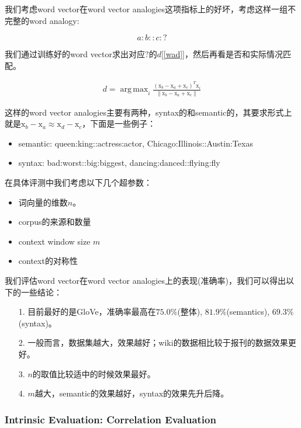 \documentclass{article}
\DeclareMathOperator*{\argmax}{arg\,max}
\begin{document}
我们考虑word vector在word vector analogies这项指标上的好坏，考虑这样一组不完整的word analogy:

$$a:b::c:\text{?}$$

我们通过训练好的word vector求出对应$?$的$d$[\ref{wad}]，然后再看是否和实际情况匹配。

\begin{eqnarray}
\label{wad}
d=\argmax_{i}{\frac{(\mathrm{x}_b-\mathrm{x}_a+\mathrm{x}_c)^T\mathrm{x}_i}{\|\mathrm{x}_b-\mathrm{x}_a+\mathrm{x}_c \|}}
\end{eqnarray}

这样的word vector analogies主要有两种，syntax的和semantic的，其要求形式上就是$\mathrm{x}_b-\mathrm{x}_a \approx \mathrm{x}_d-\mathrm{x}_c$，下面是一些例子：

\begin{itemize}
	\item semantic: queen:king::actress:actor, Chicago:Illinois::Austin:Texas
	\item syntax: bad:worst::big:biggest, dancing:danced::flying:fly
\end{itemize}

在具体评测中我们考虑以下几个超参数：

\begin{itemize}
	\item 词向量的维数$n$。
	\item corpus的来源和数量
	\item context window size $m$
	\item context的对称性
\end{itemize}

我们评估word vector在word vector analogies上的表现(准确率)，我们可以得出以下的一些结论：

\begin{itemize}
	\item[1.] 目前最好的是GloVe，准确率最高在$75.0\%$(整体), $81.9\%$(semantics), $69.3\%$(syntax)。
	\item[2.] 一般而言，数据集越大，效果越好；wiki的数据相比较于报刊的数据效果更好。
	\item[3.] $n$的取值比较适中的时候效果最好。
	\item[4.] $m$越大，semantic的效果越好，syntax的效果先升后降。
\end{itemize}

\subsubsection*{Intrinsic Evaluation: Correlation Evaluation}
\end{document}
